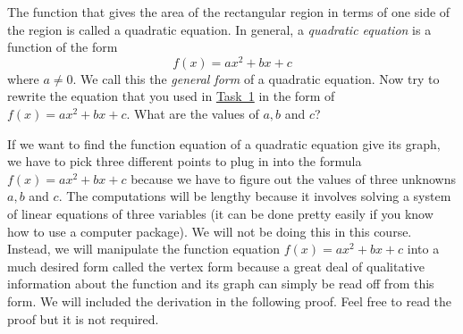 \documentclass[10pt,]{article}
\theoremstyle{plain}
\theoremstyle{definition}
\numberwithin{equation}{section}
\begin{document}
\hypertarget{p-48}{}%
The function that gives the area of the rectangular region in terms of one side of the region is called a quadratic equation. In general, a \emph{quadratic equation} is a function of the form%
\begin{equation*}
f(x) = ax^2+bx+c
\end{equation*}
where \(a \neq 0\). We call this the \emph{general form} of a quadratic equation. Now try to rewrite the equation that you used in \hyperref[motivation-quadratic]{Task~1} in the form of \(f(x)=ax^2+bx+c\). What are the values of \(a, b\) and \(c\)?%
\par
\hypertarget{p-49}{}%
If we want to find the function equation of a quadratic equation give its graph, we have to pick three different points to plug in into the formula \(f(x)=ax^2+bx+c\) because we have to figure out the values of three unknowns \(a,b\) and \(c\). The computations will be lengthy because it involves solving a system of linear equations of three variables (it can be done pretty easily if you know how to use a computer package). We will not be doing this in this course. Instead, we will manipulate the function equation \(f(x)=ax^2+bx+c\) into a much desired form called the vertex form because a great deal of qualitative information about the function and its graph can simply be read off from this form. We will included the derivation in the following proof. Feel free to read the proof but it is not required.%
\end{document}
